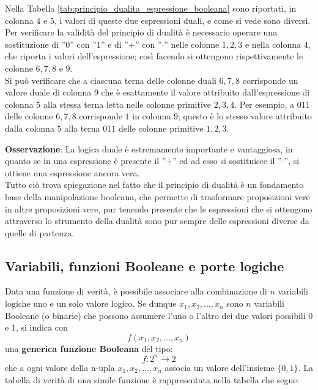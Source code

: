 \documentclass[a4paper]{extarticle}
\newcommand{\quotes}[1]{''#1''}
\begin{document}
\noindent
Nella Tabella \ref{tab:principio_dualita_espressione_booleana} sono riportati, in colonna \(4\) e \(5\), i valori di queste due espressioni duali, e come si vede sono diversi. Per verificare la validità del principio di dualità è necessario operare una sostituzione di \quotes{\(0\)} con \quotes{\(1\)} e di \quotes{\(+\)} con \quotes{\(\cdot\)} nelle colonne \(1, 2, 3\) e nella colonna \(4\), che riporta i valori dell’espressione; così facendo si ottengono rispettivamente le colonne \(6, 7, 8\) e \(9\).\\
Si può verificare che a ciascuna terna delle colonne duali \(6, 7, 8\) corrisponde un valore duale di colonna \(9\) che è esattamente il valore attribuito dall’espressione di colonna \(5\) alla stessa terna letta nelle colonne primitive \(2, 3, 4\). Per esempio, a \(011\) delle colonne \(6, 7, 8\) corrisponde \(1\) in colonna \(9\); questo è lo stesso valore attribuito dalla colonna \(5\) alla terna \(011\) delle colonne primitive \(1, 2, 3\).

\vspace{1em}
\noindent
\textbf{Osservazione}: La logica duale è estremamente importante e vantaggiosa, in quanto se in una espressione è presente il \quotes{\(+\)} ed ad esso si sostituisce il \quotes{\(\cdot\)}, si ottiene una espressione ancora vera.\\
Tutto ciò trova spiegazione nel fatto che il principio di dualità è un fondamento base della manipolazione booleana, che permette di trasformare proposizioni vere in altre proposizioni vere, pur tenendo presente che le espressioni che si ottengono attraverso lo strumento della dualità sono pur sempre delle espressioni diverse da quelle di partenza.

\subsection{Variabili, funzioni Booleane e porte logiche}
Data una funzione di verità, è possibile associare alla combinazione di \(n\) variabili logiche uno e un solo valore logico. Se dunque \(x_1, x_2, ..., x_n\) sono \(n\) variabili Booleane (o binarie) che possono assumere l’uno o l’altro dei due valori possibili \(0\) e \(1\), si indica con
\[f(x_1, x_2, ..., x_n)\]
una \textbf{generica funzione Booleana} del tipo:
\[f : 2^n \rightarrow 2\]
che a ogni valore della n-upla \(x_1, x_2, ..., x_n\) associa un valore dell’insieme \(\{0, 1\}\). La tabella di verità di una simile funzione è rappresentata nella tabella che segue:
\end{document}
